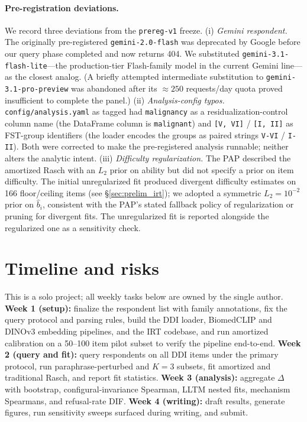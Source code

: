 \documentclass{article}
\begin{document}
\paragraph{Pre-registration deviations.}
We record three deviations from the \texttt{prereg-v1} freeze.
(i) \emph{Gemini respondent.} The originally pre-registered \texttt{gemini-2.0-flash} was deprecated by Google before our query phase completed and now returns 404. We substituted \texttt{gemini-3.1-flash-lite}---the production-tier Flash-family model in the current Gemini line---as the closest analog. (A briefly attempted intermediate substitution to \texttt{gemini-3.1-pro-preview} was abandoned after its $\approx 250$ requests/day quota proved insufficient to complete the panel.)
(ii) \emph{Analysis-config typos.} \texttt{config/analysis.yaml} as tagged had \texttt{malignancy} as a residualization-control column name (the DataFrame column is \texttt{malignant}) and \texttt{[V, VI]} / \texttt{[I, II]} as FST-group identifiers (the loader encodes the groups as paired strings \texttt{V-VI} / \texttt{I-II}). Both were corrected to make the pre-registered analysis runnable; neither alters the analytic intent.
(iii) \emph{Difficulty regularization.} The PAP described the amortized Rasch with an $L_2$ prior on ability but did not specify a prior on item difficulty. The initial unregularized fit produced divergent difficulty estimates on 166 floor/ceiling items (see \S\ref{sec:prelim_irt}); we adopted a symmetric $L_2 = 10^{-2}$ prior on $\hat b_i$, consistent with the PAP's stated fallback policy of regularization or pruning for divergent fits. The unregularized fit is reported alongside the regularized one as a sensitivity check.

\section{Timeline and risks}
\label{sec:timeline_risks}

This is a solo project; all weekly tasks below are owned by the single author. \textbf{Week 1 (setup):} finalize the respondent list with family annotations, fix the query protocol and parsing rules, build the DDI loader, BiomedCLIP and DINOv3 embedding pipelines, and the IRT codebase, and run amortized calibration on a 50--100 item pilot subset to verify the pipeline end-to-end. \textbf{Week 2 (query and fit):} query respondents on all DDI items under the primary protocol, run paraphrase-perturbed and $K = 3$ subsets, fit amortized and traditional Rasch, and report fit statistics. \textbf{Week 3 (analysis):} aggregate $\Delta$ with bootstrap, configural-invariance Spearman, LLTM nested fits, mechanism Spearmans, and refusal-rate DIF. \textbf{Week 4 (writing):} draft results, generate figures, run sensitivity sweeps surfaced during writing, and submit.
\end{document}
